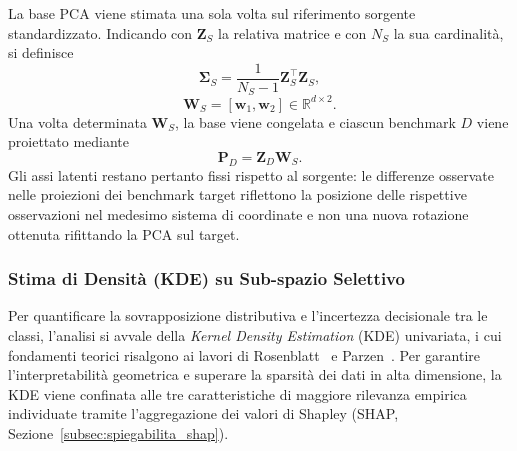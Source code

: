 La base PCA viene stimata una sola volta sul riferimento sorgente standardizzato. Indicando con $\mathbf{Z}_S$ la relativa matrice e con $N_S$ la sua cardinalità, si definisce
\begin{equation}
    \boldsymbol{\Sigma}_S=\frac{1}{N_S-1}\mathbf{Z}_S^\top\mathbf{Z}_S,
    \label{eq:cov_matrix}
\end{equation}
\begin{equation}
    \mathbf{W}_S=[\mathbf{w}_1,\mathbf{w}_2]\in\mathbb{R}^{d\times2}.
    \label{eq:pca_basis_source}
\end{equation}
Una volta determinata $\mathbf{W}_S$, la base viene congelata e ciascun benchmark $D$ viene proiettato mediante
\begin{equation}
    \mathbf{P}_D=\mathbf{Z}_D\mathbf{W}_S.
    \label{eq:pca_projection_source}
\end{equation}
Gli assi latenti restano pertanto fissi rispetto al sorgente: le differenze osservate nelle proiezioni dei benchmark target riflettono la posizione delle rispettive osservazioni nel medesimo sistema di coordinate e non una nuova rotazione ottenuta rifittando la PCA sul target.

\subsubsection{Stima di Densità (KDE) su Sub-spazio Selettivo}
\label{subsubsec:kde_features}
Per quantificare la sovrapposizione distributiva e l'incertezza decisionale tra le classi, l'analisi si avvale della \textit{Kernel Density Estimation} (KDE) univariata, i cui fondamenti teorici risalgono ai lavori di Rosenblatt~\cite{rosenblatt1956} e Parzen~\cite{parzen1962}. Per garantire l'interpretabilità geometrica e superare la sparsità dei dati in alta dimensione, la KDE viene confinata alle tre caratteristiche di maggiore rilevanza empirica individuate tramite l'aggregazione dei valori di Shapley (SHAP, Sezione~\ref{subsec:spiegabilita_shap}).

